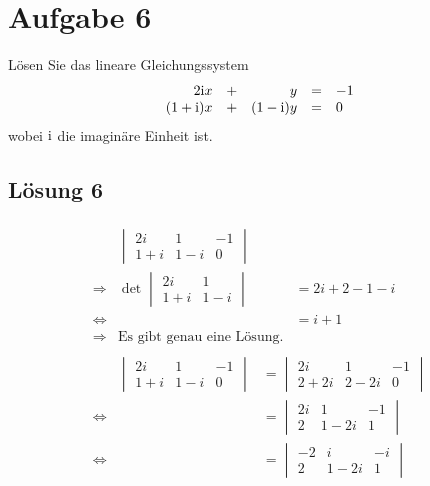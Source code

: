 \documentclass[main.tex]{subfiles}
\begin{document}
\section{Aufgabe 6}
Lösen Sie das lineare Gleichungssystem
$$
    \begin{array}{rcrcl}
        2\mathrm{i}x &+ & y &= & -1 \\
        (1+\mathrm{i})x &+ & (1-\mathrm{i})y &= & 0\\
    \end{array}
$$
wobei $\mathrm{i}$ die imaginäre Einheit ist.

\renewcommand{\equiv}{\Leftrightarrow}

\subsection{Lösung 6}
\begin{align*}
	\begin{array}{rrl}
		&\begin{vmatrix}
			2i & 1 & -1\\
			1+i & 1-i & 0
		\end{vmatrix}&\\[5mm]
		\Rightarrow & \det\begin{vmatrix}
			2i & 1\\
			1+i & 1-i
		\end{vmatrix} & = 2i+2-1-i\\
		\equiv & & = i+1\\
		\Rightarrow & \text{Es gibt genau eine Lösung.}&
	\end{array}\\
	\begin{array}{rrl}
		&\begin{vmatrix}
			2i & 1 & -1\\
			1+i & 1-i & 0
		\end{vmatrix}& =\begin{vmatrix}
			2i & 1 & -1\\
			2+2i & 2-2i & 0
		\end{vmatrix}\\[5mm]
		\equiv && = \begin{vmatrix}
			2i & 1 & -1\\
			2 & 1-2i & 1
		\end{vmatrix}\\[5mm]
		\equiv && = \begin{vmatrix}
			-2 & i & -i\\
			2 & 1-2i & 1
		\end{vmatrix}\\[5mm]

\end{array}
\end{align*}
\end{document}
